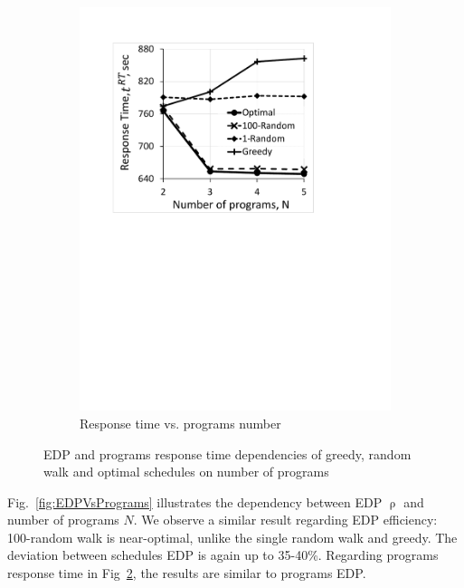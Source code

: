 \begin{figure}
\begin{subfigure}{0.38\textwidth}
        \includegraphics[width=1\linewidth]{figs/RTVsPrograms.pdf}
        \caption{Response time vs. programs number}
        \label{fig:RTVsPrograms}
    \end{subfigure}
    \caption{EDP and programs response time dependencies of greedy, random walk and optimal schedules on number of programs}
\end{figure}


Fig.~\ref{fig:EDPVsPrograms} illustrates the dependency between EDP $\uprho$ and number of programs $N$. We observe a similar result regarding EDP efficiency: 100-random walk is near-optimal, unlike the single random walk and greedy. The deviation between schedules EDP is again up to 35-40\%. Regarding programs response time in Fig~\ref{fig:RTVsPrograms}, the results are similar to programs EDP.